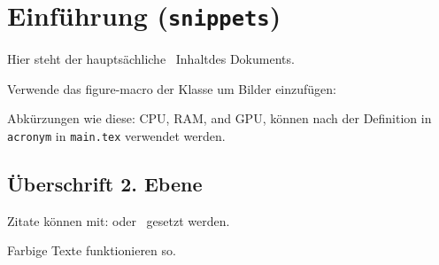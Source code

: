 
\section{Einführung (\texttt{snippets})}
Hier steht der hauptsächliche \glqq~Inhalt\grqq des Dokuments.

Verwende das figure-macro der Klasse um Bilder einzufügen:

Abkürzungen wie diese:
\ac{CPU}, \ac{RAM}, and \ac{GPU}, 
können nach der Definition in \texttt{acronym} in \texttt{main.tex} verwendet werden.


    \subsection{Überschrift 2. Ebene}
    Zitate können mit: \parencite{knuth1984} oder~\cite{knuth1984} gesetzt werden.

    Farbige  \textcolor{FAVblue}{Texte} funktionieren so.